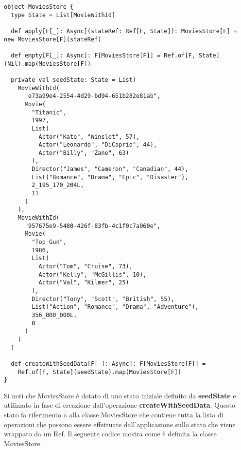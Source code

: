 \begin{verbatim}
object MoviesStore {
  type State = List[MovieWithId]

  def apply[F[_]: Async](stateRef: Ref[F, State]): MoviesStore[F] = new MoviesStore[F](stateRef)

  def empty[F[_]: Async]: F[MoviesStore[F]] = Ref.of[F, State](Nil).map(MoviesStore[F])

  private val seedState: State = List(
    MovieWithId(
      "e73a99e4-2554-4d29-bd94-651b282e81ab",
      Movie(
        "Titanic",
        1997,
        List(
          Actor("Kate", "Winslet", 57),
          Actor("Leonardo", "DiCaprio", 44),
          Actor("Billy", "Zane", 63)
        ),
        Director("James", "Cameron", "Canadian", 44),
        List("Romance", "Drama", "Epic", "Disaster"),
        2_195_170_204L,
        11
      )
    ),
    MovieWithId(
      "957675e9-5480-426f-83fb-4c1f0c7a060e",
      Movie(
        "Top Gun",
        1986,
        List(
          Actor("Tom", "Cruise", 73),
          Actor("Kelly", "McGillis", 10),
          Actor("Val", "Kilmer", 25)
        ),
        Director("Tony", "Scott", "British", 55),
        List("Action", "Romance", "Drama", "Adventure"),
        356_800_000L,
        0
      )
    )
  )

  def createWithSeedData[F[_]: Async]: F[MoviesStore[F]] =
    Ref.of[F, State](seedState).map(MoviesStore[F])
}
\end{verbatim}

\noindent Si noti che MoviesStore è dotato di uno stato iniziale definito da \textbf{seedState} e utilizzato in fase di creazione dall'operazione \textbf{createWithSeedData}. Questo stato fa riferimento a alla classe MoviesStore che contiene tutta la lista di operazioni che possono essere effettuate dall'applicazione sullo stato che viene wrappato da un Ref. Il seguente codice mostra come è definita la classe MoviesStore.

